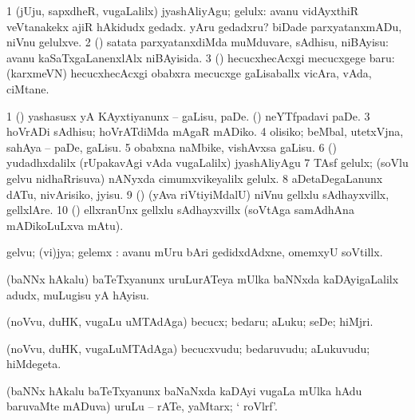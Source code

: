 {{{{{{\noindent 
\gl{\akirx}
\expl{}
\bmng
\bnum
\num{1} (jUju, sapxdheR, \mo vugaLalilx) jyashAliyAgu; gelulx:  avanu vidAyxthiR veVtanakekx ajiR hAkidudx gedadx.  yAru gedadxru?  biDade parxyatanxmADu, niVnu gelulxve. 
\num{2} (\AmA) satata parxyatanxdiMda muMduvare, sAdhisu, niBAyisu:  avanu kaSaTxgaLanenxlAlx niBAyisida. 
\num{3} (\pArxparx) hecucxhecAcxgi mecucxgege baru:  (karxmeVN) hecucxhecAcxgi obabxra mecucxge gaLisaballx vicAra, vAda, ciMtane. 
\enum
\emng

\noindent 
\gl{\pagu}
\expl{}
\bmng
\bnum
\num{1}  
  
\banum
{} (\AmA) yashasusx yA KAyxtiyanunx -- gaLisu, paDe. 
 (\ca) neYTfpadavi paDe. 
\eanum
\numie
\num{3}  hoVrADi sAdhisu; hoVrATdiMda mAgaR mADiko. 
\num{4}  olisiko; beMbal, utetxVjna, sahAya -- paDe, gaLisu. 
\num{5}  obabxna naMbike, vishAvxsa gaLisu. 
\num{6}  () \pArxparx\  yudadhxdalilx (rUpakavAgi vAda \mo vugaLalilx) jyashAliyAgu 
\num{7}  TAsf gelulx; (soVlu gelvu nidhaRrisuva) nANyxda cimumxvikeyalilx gelulx. 
\num{8} aDetaDegaLanunx dATu, nivArisiko, jyisu. 
\num{9}  (\AmA) (yAva riVtiyiMdalU) niVnu gellxlu sAdhayxvillx, gellxlAre. 
\num{10}  (\AmA) ellxranUnx gellxlu sAdhayxvillx (soVtAga samAdhAna mADikoLuLxva mAtu). 
\enum
\emng
\eentry

\bentry
{}
\gl{\nA}
\bmng
gelvu; (vi)jya; gelemx :  avanu mUru bAri gedidxdAdxne, omemxyU soVtillx. 
\emng
\eentry

\bentry
{} 
\gl{\sakirx}
\expl{}
\bmng
(baNNx hAkalu) baTeTxyanunx uruLurATeya mUlka baNNxda kaDAyigaLalilx adudx, muLugisu yA hAyisu. 
\emng

\noindent 
\gl{\akirx}
\bmng
(noVvu, duHK, \mo vugaLu uMTAdAga) becucx; bedaru; aLuku; seDe; hiMjri. 
\emng
\eentry

\bentry
{} 
\gl{\nA}
\bmng
(noVvu, duHK, \mo vugaLuMTAdAga) becucxvudu; bedaruvudu; aLukuvudu; hiMdegeta. 
\emng
\eentry

\bentry
{} 
\gl{\nA}
\bmng
(baNNx hAkalu baTeTxyanunx baNaNxda kaDAyi \mo vugaLa mUlka hAdu baruvaMte mADuva) uruLu -- rATe, yaMtarx; ` roVlrf'. 
\emng
\eentry

}}}}}}
